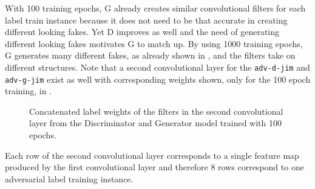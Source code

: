 With 100 training epochs, G already creates similar convolutional filters for each label train instance because it does not need to be that accurate in creating different looking fakes.
Yet D improves as well and the need of generating different looking fakes motivates G to match up.
By using 1000 training epochs, G generates many different fakes, as already shown in , and the filters take on different structures.
Note that a second convolutional layer for the \texttt{adv-d-jim} and \texttt{adv-g-jim} exist as well with corresponding weights shown, only for the 100 epoch training, in .
\begin{figure}[!ht]
  \centering
  \qquad \qquad
  \caption{Concatenated label weights of the filters in the second convolutional layer from the Discriminator and Generator model trained with 100 epochs.}
  \label{fig:nn_adv_label_weights_conv1}
\end{figure}
\FloatBarrier
\noindent
Each row of the second convolutional layer corresponds to a single feature map produced by the first convolutional layer and therefore 8 rows correspond to one adversarial label training instance.